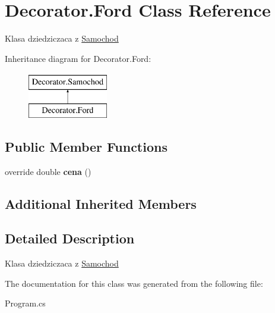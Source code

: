 \hypertarget{class_decorator_1_1_ford}{}\section{Decorator.\+Ford Class Reference}
\label{class_decorator_1_1_ford}


Klasa dziedziczaca z \hyperlink{class_decorator_1_1_samochod}{Samochod}  


Inheritance diagram for Decorator.\+Ford\+:\begin{figure}[H]
\begin{center}
\leavevmode
\includegraphics[height=2.000000cm]{class_decorator_1_1_ford}
\end{center}
\end{figure}
\subsection*{Public Member Functions}
\begin{DoxyCompactItemize}
\item 
\mbox{\label{class_decorator_1_1_ford_af514c0d0a73eb596258f1ba23d613d30}} 
override double {\bfseries cena} ()
\end{DoxyCompactItemize}
\subsection*{Additional Inherited Members}


\subsection{Detailed Description}
Klasa dziedziczaca z \hyperlink{class_decorator_1_1_samochod}{Samochod} 



The documentation for this class was generated from the following file\+:\begin{DoxyCompactItemize}
\item 
Program.\+cs\end{DoxyCompactItemize}
